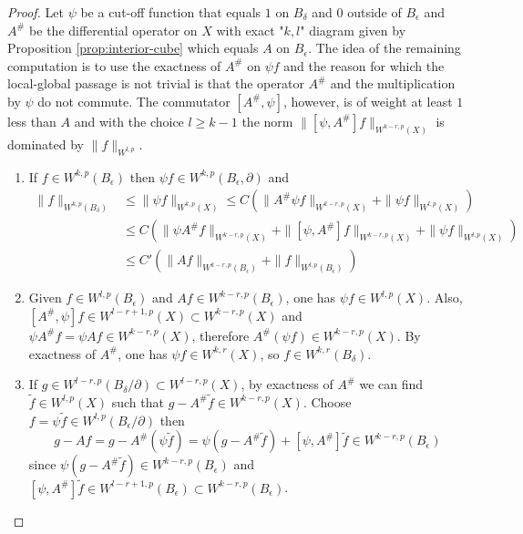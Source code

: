\begin{proof}
Let \(\psi\) be a cut-off function that equals \(1\) on \(B_\delta\) and \(0\)
outside of \(B_\epsilon\) and \(A^\#\) be the differential operator on \(X\) with
exact "\(k,l\)" diagram given by Proposition \ref{prop:interior-cube} which equals \(A\)
on \(B_\epsilon\). The idea of the remaining computation is to use the exactness of \(A^\#\)
on \(\psi f\) and the reason for which the local-global passage is not trivial is that
the operator \(A^\#\) and the multiplication by \(\psi\) do not commute. The
commutator \([A^\#,\psi]\), however, is of weight at least \(1\) less than \(A\) and
with the choice \(l\geq k-1\) the norm \(\|[\psi, A^\#]f\|_{W^{k-r,p}(X)}\) is
dominated by \(\|f\|_{W^{l,p}}\).

\begin{enumerate}
\item If \(f\in W^{k,p}(B_\epsilon)\) then \(\psi f\in W^{k,p}(B_\epsilon, \partial)\)
and 
\begin{align*}
\|f\|_{W^{k,p}(B_\delta)} &\leq \| \psi f\|_{W^{k,p}(X)} \leq C \left( \|A^\#\psi f\|_{W^{k-r,p}(X)} + \|\psi f\|_{W^{l,p}(X)}  \right)\\
   			  &\leq C \left( \|\psi A^\# f\|_{W^{k-r,p}(X)} + \| [\psi, A^\#] f \|_{W^{k-r,p}(X)} + \|\psi f \|_{W^{l,p}(X)}  \right)\\
			  &\leq C' \left( \| Af \|_{W^{k-r,p}(B_\epsilon)} + \| f \|_{W^{l,p}(B_\epsilon)} \right)
\end{align*}
\item Given \(f\in W^{l,p}(B_\epsilon)\) and \(Af\in W^{k-r,p}(B_\epsilon)\), one has \(\psi f\in W^{l,p}(X)\). Also, \([A^\#, \psi] f \in W^{l-r+1,p}(X)\subset W^{k-r,p}(X)\) and \(\psi A^\# f = \psi A f\in W^{k-r,p}(X)\), therefore \(A^\#(\psi f)\in
   W^{k-r,p}(X)\). By exactness of \(A^\#\), one has \(\psi f\in W^{k,r}(X)\), so \(f\in W^{k,r}(B_\delta)\).
\item If \(g\in W^{l-r,p}(B_\delta/ \partial) \subset W^{l-r,p}(X)\), by exactness
of \(A^\#\) we can find
\(\tilde f \in W^{l,p}(X)\) such that \(g-A^\# \tilde f \in W^{k-r,p}(X)\). Choose \(f =
   \psi \tilde f \in W^{l,p}(B_\epsilon/ \partial)\) then 
\[
    g- Af = g - A^\#(\psi \tilde f) = \psi(g- A^\# \tilde f) + [\psi, A^\#]\tilde f \in W^{k-r,p}(B_\epsilon)
   \]
since \(\psi(g- A^\# \tilde f)\in W^{k-r,p}(B_\epsilon)\) and \([\psi, A^\#]\tilde f
   \in W^{l-r+1,p}(B_\epsilon) \subset W^{k-r,p}(B_\epsilon)\).
\end{enumerate}
\end{proof}

